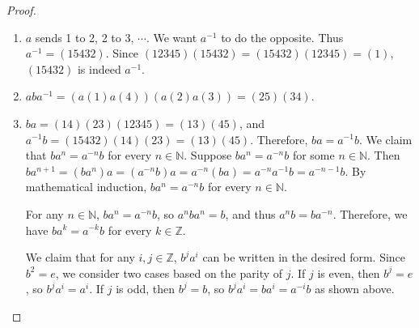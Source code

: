 \documentclass[12pt, psamsfonts]{amsart}
\theoremstyle{definition}
\theoremstyle{remark}
\numberwithin{equation}{section}
\begin{document}
\begin{proof}
  $ $
  \begin{enumerate}
    \item
      $a$ sends 1 to 2, 2 to 3, $\cdots$.
      We want $a^{-1}$ to do the opposite.
      Thus $a^{-1} = (15432)$.
      Since $(12345)(15432) = (15432)(12345) = (1)$, $(15432)$ is indeed $a^{-1}$.
    \item
      $aba^{-1} = (a(1)a(4))(a(2)a(3)) = (25)(34)$.
    \item
      $ba = (14)(23)(12345) = (13)(45)$, and $a^{-1}b = (15432)(14)(23) = (13)(45)$.
      Therefore, $ba = a^{-1}b$.
      We claim that $ba^n = a^{-n}b$ for every $n \in \mathbb{N}$.
      Suppose $ba^n = a^{-n}b$ for some $n \in \mathbb{N}$.
      Then $ba^{n + 1} = (ba^n)a = (a^{-n}b)a = a^{-n}(ba) = a^{-n}a^{-1}b = a^{-n-1}b$.
      By mathematical induction, $ba^n = a^{-n}b$ for every $n \in \mathbb{N}$.

      For any $n \in \mathbb{N}$, $ba^n = a^{-n}b$, so $a^nba^n = b$, and thus $a^nb = ba^{-n}$.
      Therefore, we have $ba^k = a^{-k}b$ for every $k \in \mathbb{Z}$.

      We claim that for any $i, j \in \mathbb{Z}$, $b^ja^i$ can be written in the desired form.
      Since $b^2 = e$, we consider two cases based on the parity of $j$.
      If $j$ is even, then $b^j = e$, so $b^ja^i = a^i$.
      If $j$ is odd, then $b^j = b$, so $b^ja^i = ba^i = a^{-i}b$ as shown above.


\end{enumerate}
\end{proof}
\end{document}
